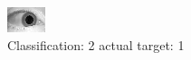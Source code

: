 \begin{figure}[h!]
\begin{center}
\includegraphics[width=0.60\columnwidth]{figures/ID1519_class_2_target_1.png}
\end{center}
\caption{ Classification: 2 actual target: 1}
\label{fig:ID1519_class_2_target_1}
\end{figure}
